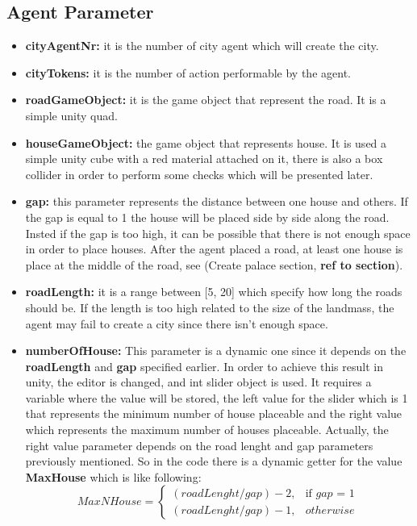 \documentclass[12pt]{article}
\begin{document}
    \subsection{Agent Parameter}
    \begin{itemize}
        \item \textbf{cityAgentNr:} it is the number of city agent which will create the city.
        \item \textbf{cityTokens:} it is the number of action performable by the agent.
        \item \textbf{roadGameObject:} it is the game object that represent the road. It is a simple unity quad.
        \item \textbf{houseGameObject:} the game object that represents house. It is used a simple unity cube with a red material attached on it, there is also a box collider
        in order to perform some checks which will be presented later.
        \item \textbf{gap:} this parameter represents the distance between one house and others. If the gap is equal to 1 the house will be placed side by side
        along the road. Insted if the gap is too high, it can be possible that there is not enough space in order to place houses. After the agent placed a road,
        at least one house is place at the middle of the road, see (Create palace section, \textbf{ref to section}). 
        \item \textbf{roadLength:} it is a range between [5, 20] which specify how long the roads should be. If the length is too high related to the size of the landmass,
        the agent may fail to create a city since there isn't enough space. 
        \item \textbf{numberOfHouse:} This parameter is a dynamic one since it depends on the \textbf{roadLength} and \textbf{gap} specified earlier. In order to achieve this result in unity,
        the editor is changed, and int slider object is used. It requires a variable where the value will be stored, the left value for the slider which is 1 that
        represents the minimum number of house placeable and the right value which represents the maximum number of houses placeable. Actually, the right value parameter depends on
        the road lenght and gap parameters previously mentioned. So in the code there is a dynamic getter for the value \textbf{MaxHouse} which is like following:
        \begin{equation}
            MaxNHouse = \begin{cases} (roadLenght/gap) - 2, & \mbox{if } gap\mbox{ = 1} \\ (roadLenght/gap) - 1, & \mbox{} otherwise\  \end{cases}
        \end{equation}


\end{itemize}
\end{document}
